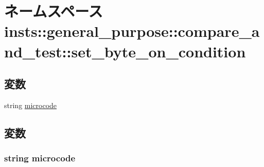 \hypertarget{namespaceinsts_1_1general__purpose_1_1compare__and__test_1_1set__byte__on__condition}{
\section{ネームスペース insts::general\_\-purpose::compare\_\-and\_\-test::set\_\-byte\_\-on\_\-condition}
\label{namespaceinsts_1_1general__purpose_1_1compare__and__test_1_1set__byte__on__condition}
}
\subsection*{変数}
\begin{DoxyCompactItemize}
\item 
string \hyperlink{namespaceinsts_1_1general__purpose_1_1compare__and__test_1_1set__byte__on__condition_a770f11a173e99389a8802f0107ed8f52}{microcode}
\end{DoxyCompactItemize}


\subsection{変数}
\hypertarget{namespaceinsts_1_1general__purpose_1_1compare__and__test_1_1set__byte__on__condition_a770f11a173e99389a8802f0107ed8f52}{
\subsubsection[{microcode}]{\setlength{\rightskip}{0pt plus 5cm}string {\bf microcode}}}
\label{namespaceinsts_1_1general__purpose_1_1compare__and__test_1_1set__byte__on__condition_a770f11a173e99389a8802f0107ed8f52}
